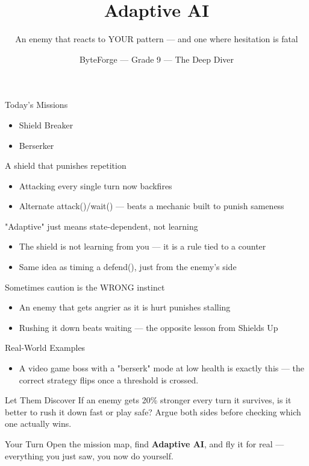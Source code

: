\documentclass[aspectratio=169]{beamer}
\title{Adaptive AI}
\subtitle{An enemy that reacts to YOUR pattern --- and one where hesitation is fatal}
\author{ByteForge --- Grade 9 --- The Deep Diver}
\date{}
\begin{document}
\begin{frame}
    \titlepage
\end{frame}

\begin{frame}{Today's Missions}
    \Large
    \begin{itemize}
        \item Shield Breaker
        \item Berserker
    \end{itemize}
\end{frame}

\begin{frame}{A shield that punishes repetition}
    \large
    \begin{itemize}
        \item Attacking every single turn now backfires
        \item Alternate attack()/wait() --- beats a mechanic built to punish sameness
    \end{itemize}
\end{frame}


\begin{frame}{"Adaptive" just means state-dependent, not learning}
    \large
    \begin{itemize}
        \item The shield is not learning from you --- it is a rule tied to a counter
        \item Same idea as timing a defend(), just from the enemy's side
    \end{itemize}
\end{frame}


\begin{frame}{Sometimes caution is the WRONG instinct}
    \large
    \begin{itemize}
        \item An enemy that gets angrier as it is hurt punishes stalling
        \item Rushing it down beats waiting --- the opposite lesson from Shields Up
    \end{itemize}
\end{frame}

\begin{frame}{Real-World Examples}
    \large
    \begin{itemize}
        \item A video game boss with a "berserk" mode at low health is exactly this --- the correct strategy flips once a threshold is crossed.
    \end{itemize}
\end{frame}


\begin{frame}{Let Them Discover}
    \large
    If an enemy gets 20\% stronger every turn it survives, is it better to rush it down fast or play safe? Argue both sides before checking which one actually wins.
\end{frame}

\begin{frame}{Your Turn}
    \Large
    Open the mission map, find \textbf{Adaptive AI}, and fly it for real ---
    everything you just saw, you now do yourself.
\end{frame}
\end{document}
